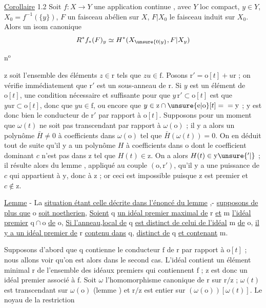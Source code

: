 \uline{Corollaire} 1.2 Soit $f:X\to Y$ une application
continue , avec $Y$ loc compact,
 $y\in Y$, $X_0=f^{-1}(\{y\})$, $F$ un faisceau
abélien sur $X$, $F|X_0$ le faisceau induit
sur $X_0$. Alors  un isom
canonique
\[
R^*f_{*}(F)_y\simeq H^*(X_{\unsure{0|y}},F|X_y)
\]

n$^{\mathrm{o}}$ 

$\mathrm z$ soit l'ensemble des éléments $z\in\mathrm r$ tels que $zu\in\mathrm f$.
Posons $\mathrm r'=\mathrm o[t]+u\mathrm r$ ; on vérifie immédiatement que $\mathrm r'$
est un sous-anneau de $\mathrm r$. Si $y$ est un élément de $\mathrm o[t]$, une
condition nécessaire et suffisante pour que $y\,\mathrm r'\subset\mathrm o[t]$ est
que $yu\mathrm r\subset\mathrm o[t]$, donc que $yu\in\mathrm f$, ou encore que $y\in\mathrm z\cap\unsure{\mathrm e|\mathrm o}[t]={}
=\mathrm y$ ; $\mathrm y$ est donc bien le conducteur de $\mathrm r'$ par rapport à $\mathrm o[t]$.
Supposons pour un moment que $\omega(t)$ ne soit pas transcendant par
rapport à $\omega(\mathrm o)$ ; il y a alors un polynôme $\bar H\ne 0$ à coefficients
dans $\omega(\mathrm o)$ tel que $\bar H(\omega(t))=0$. On en déduit tout de suite qu'il
y a un polynôme $H$ à coefficients dans $\mathrm o$ dont le coefficient dominant
$c$ n'est pas dans $\mathrm z$ tel que $H(t)\in\mathrm z$. On a alors $H(t)\in\mathrm y\unsure{'|\vphantom{'}}$ ;
il résulte alors du lemme , appliqué au couple $(\mathrm o,\mathrm r')$,
qu'il y a une puissance de $c$ qui appartient à $\mathrm y$, donc à $\mathrm z$ ; or
ceci est impossible puisque $\mathrm z$ est premier et $c\notin\mathrm z$.

\uline{Lemme}  - La \uline{situation étant celle décrite dans l'énoncé du
lemme} ,- \uline{supposons de plus que} $\mathrm o$ \uline{soit noetherien}, \uline{Soient} $\mathrm q$ \uline{un
idéal premier maximal de} $\mathrm r$ \uline{et} $\mathrm m$ \uline{l'idéal premier} $\mathrm q\cap\mathrm o$ \uline{de} $\mathrm o$,
\uline{Si l'anneau,local de} $\mathrm q$ \uline{est distinct de celui de l'idéal} $\mathrm m$ \uline{de} $\mathrm o$,
\uline{il y a un idéal premier de} $\mathrm r$ \uline{contenu dans} $\mathrm q$, \uline{distinct de} $\mathrm q$
\uline{et contenant} $\mathrm m$.

Supposons d'abord que $\mathrm q$ contienne le conducteur $\mathrm f$ de $\mathrm r$
par rapport à $\mathrm o[t]$ ; nous allons voir qu'on est alors dans le
second cas. L'idéal \hspace{1.5em} contient un élément minimal $\mathrm r$ de l'ensemble
des idéaux premiers qui contiennent $\mathrm f$ ; $\mathrm z$ est donc un idéal
premier associé à $\mathrm f$. Soit $\omega$ l'homomorphisme canonique de $\mathrm r$
sur $\mathrm r/\mathrm z$ ; $\omega(t)$ est transcendant sur $\omega(\mathrm o)$ (lemme ) et $\mathrm r/\mathrm z$
est entier sur $(\omega(\mathrm o))[\omega(t)]$. Le noyau de la restriction

